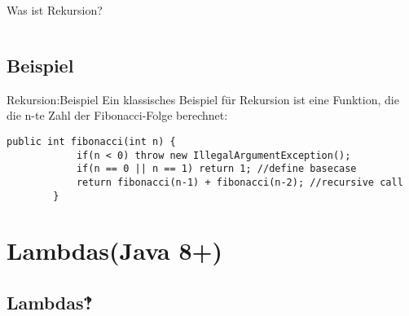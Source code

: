 \begin{frame}{Was ist Rekursion?}
    \begin{columns}[T]
        \begin{column}{.5\textwidth}
        \end{column}
        \begin{column}{.5\textwidth}
        \end{column}
    \end{columns}
\end{frame}

\subsection{Beispiel}

\begin{frame}[fragile]{Rekursion:Beispiel}
    Ein klassisches Beispiel für Rekursion ist eine Funktion, die die n-te Zahl der Fibonacci-Folge berechnet:
    \begin{lstlisting}[gobble=8]
        public int fibonacci(int n) {
            if(n < 0) throw new IllegalArgumentException();
            if(n == 0 || n == 1) return 1; //define basecase
            return fibonacci(n-1) + fibonacci(n-2); //recursive call
        }
    \end{lstlisting}
    \vfill
\end{frame}

\section{Lambdas(Java 8+)}
\subsection{Lambdas‽}

